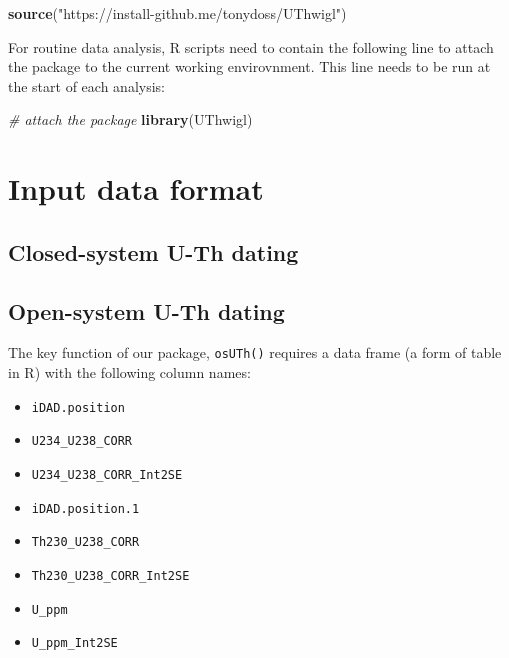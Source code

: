 \documentclass[]{elsarticle} %
\providecommand{\tightlist}{%
  \setlength{\itemsep}{0pt}\setlength{\parskip}{0pt}}
\newenvironment{Shaded}{\begin{snugshade}}{\end{snugshade}}
\newcommand{\CommentTok}[1]{\textcolor[rgb]{0.56,0.35,0.01}{\textit{#1}}}
\newcommand{\KeywordTok}[1]{\textcolor[rgb]{0.13,0.29,0.53}{\textbf{#1}}}
\newcommand{\NormalTok}[1]{#1}
\newcommand{\StringTok}[1]{\textcolor[rgb]{0.31,0.60,0.02}{#1}}
\begin{document}
\begin{Shaded}
\begin{Highlighting}[]
\KeywordTok{source}\NormalTok{(}\StringTok{"https://install-github.me/tonydoss/UThwigl"}\NormalTok{)}
\end{Highlighting}
\end{Shaded}

For routine data analysis, R scripts need to contain the following line to attach the package to the current working envirovnment. This line needs to be run at the start of each analysis:

\begin{Shaded}
\begin{Highlighting}[]
\CommentTok{# attach the package}
\KeywordTok{library}\NormalTok{(UThwigl)}
\end{Highlighting}
\end{Shaded}

\newpage

\hypertarget{input-data-format}{%
\section{Input data format}\label{input-data-format}}

\hypertarget{closed-system-u-th-dating}{%
\subsection{Closed-system U-Th dating}\label{closed-system-u-th-dating}}

\hypertarget{open-system-u-th-dating}{%
\subsection{Open-system U-Th dating}\label{open-system-u-th-dating}}

The key function of our package, \texttt{osUTh()} requires a data frame (a form of table in R) with the following column names:

\begin{itemize}
\tightlist
\item
  \texttt{iDAD.position}
\item
  \texttt{U234\_U238\_CORR}
\item
  \texttt{U234\_U238\_CORR\_Int2SE}
\item
  \texttt{iDAD.position.1}
\item
  \texttt{Th230\_U238\_CORR}
\item
  \texttt{Th230\_U238\_CORR\_Int2SE}
\item
  \texttt{U\_ppm}
\item
  \texttt{U\_ppm\_Int2SE}
\end{itemize}
\end{document}

